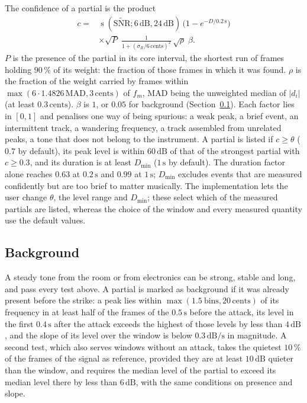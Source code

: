 \documentclass[10pt,a4paper,twocolumn]{article}
\newcommand{\dB}{\,\mathrm{dB}}
\newcommand{\s}{\,\mathrm{s}}
\newcommand{\ct}{\,\mathrm{cents}}
\newcommand{\sst}{\operatorname{s}}
\begin{document}
The confidence of a partial is the product
\begin{equation}
\begin{split}
c = {}& \sst(\widetilde{\mathrm{SNR}};6\dB,24\dB)\,\bigl(1 - e^{-D/0.2\,\mathrm{s}}\bigr)\\
&\times \sqrt{P}\; \frac{1}{1 + (\sigma_R/6\ct)^2}\, \sqrt{\rho}\; \beta .
\end{split}
\label{eq:conf}
\end{equation}
$P$ is the presence of the partial in its core interval, the shortest run of frames holding $90\,\%$ of its weight: the fraction of those frames in which it was found. $\rho$ is the fraction of the weight carried by frames within $\max(6 \cdot 1.4826\, \mathrm{MAD}, 3\ct)$ of $f_m$, MAD being the unweighted median of $|d_i|$ (at least $0.3\ct$). $\beta$ is $1$, or $0.05$ for background (Section~\ref{sec:bg}). Each factor lies in $[0,1]$ and penalises one way of being spurious: a weak peak, a brief event, an intermittent track, a wandering frequency, a track assembled from unrelated peaks, a tone that does not belong to the instrument. A partial is listed if $c \ge \theta$ ($0.7$ by default), its peak level is within $60\dB$ of that of the strongest partial with $c \ge 0.3$, and its duration is at least $D_{\min}$ ($1\s$ by default). The duration factor alone reaches $0.63$ at $0.2\s$ and $0.99$ at $1\s$; $D_{\min}$ excludes events that are measured confidently but are too brief to matter musically. The implementation lets the user change $\theta$, the level range and $D_{\min}$; these select which of the measured partials are listed, whereas the choice of the window and every measured quantity use the default values.

\subsection{Background}
\label{sec:bg}

A steady tone from the room or from electronics can be strong, stable and long, and pass every test above. A partial is marked as background if it was already present before the strike: a peak lies within $\max(1.5\ \text{bins}, 20\ct)$ of its frequency in at least half of the frames of the $0.5\s$ before the attack, its level in the first $0.4\s$ after the attack exceeds the highest of those levels by less than $4\dB$, and the slope of its level over the window is below $0.3\dB/\mathrm{s}$ in magnitude. A second test, which also serves windows without an attack, takes the quietest $10\,\%$ of the frames of the signal as reference, provided they are at least $10\dB$ quieter than the window, and requires the median level of the partial to exceed its median level there by less than $6\dB$, with the same conditions on presence and slope.
\end{document}
